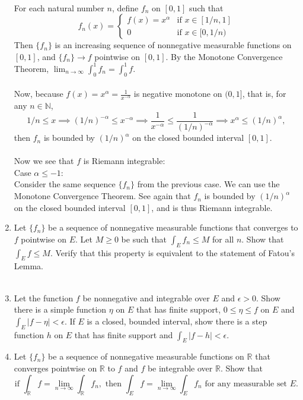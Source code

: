 \begin{enumerate}
    \\For each natural number $n$, define $f_n$ on $[0,1]$ such that
    \[
        f_n(x)=
        \begin{cases}
            f(x)=x^\alpha&\text{if }x\in[1/n,1]\\
            0&\text{if }x\in[0,1/n)
        \end{cases}
    \]
    Then $\{f_n\}$ is an increasing sequence of nonnegative measurable functions on $[0,1]$, and $\{f_n\}\to f$ pointwise on $[0,1]$.
    By the Monotone Convergence Theorem, $\lim_{n\to\infty}\int_0^1f_n=\int_0^1f$.\\
    \\Now,  because $f(x)=x^\alpha=\frac{1}{x^{-\alpha}}$ is negative monotone on $(0,1]$, that is, for any $n\in\mathbb{N}$,
    \[
        1/n\le x\implies (1/n)^{-\alpha}\le x^{-\alpha}\implies\frac{1}{x^{-\alpha}}\le\frac{1}{(1/n)^{-\alpha}}\implies x^\alpha\le(1/n)^\alpha,
    \] 
    then $f_n$ is bounded by $(1/n)^\alpha$ on the closed bounded interval $[0,1]$.\\
    \\Now we see that $f$ is Riemann integrable:
    \\Case $\alpha\le-1$:
    \\Consider the same sequence $\{f_n\}$ from the previous case. 
    We can use the Monotone Convergence Theorem.
    See again that $f_n$ is bounded by $(1/n)^\alpha$ on the closed bounded interval $[0,1]$, and is thus Riemann integrable.
    \item Let $\{f_n\}$ be a sequence of nonnegative measurable functions that converges to $f$ pointwise on $E$.
    Let $M\ge0$ be such that $\int_Ef_n\le M$ for all $n$. Show that $\int_Ef\le M$. Verify that this property is equivalent to the statement of Fatou's Lemma.\\
    \\
    \item Let the function $f$ be nonnegative and integrable over $E$ and $\epsilon>0$. Show there is a simple function $\eta$ on $E$ that has finite support, $0\le\eta\le f$ on $E$ and $\int_E|f-\eta|<\epsilon$.
    If $E$ is a closed, bounded interval, show there is a step function $h$ on $E$ that has finite support and $\int_E|f-h|<\epsilon$.
    \item Let $\{f_n\}$ be a sequence of nonnegative measurable functions on $\mathbb{R}$ that converges pointwise on $\mathbb{R}$ to $f$ and $f$ be integrable over $\mathbb{R}$. Show that
    \[
        \text{if }\int_{\mathbb{R}}f=\lim_{n\to\infty}\int_{\mathbb{R}}f_n,\text{ then }\int_Ef=\lim_{n\to\infty}\int_Ef_n\text{ for any measurable set }E.    
\]
\end{enumerate}
